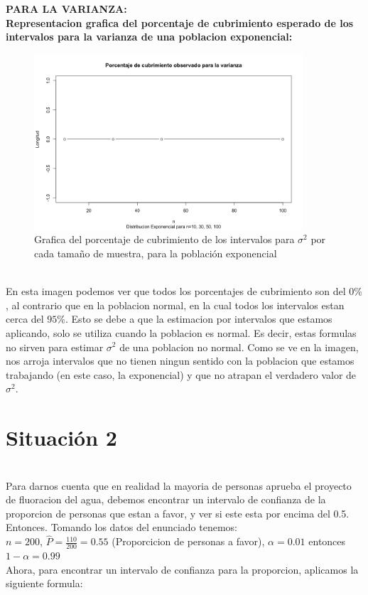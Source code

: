 \documentclass[letterpaper,12pt,onecolumn,titlepage]{article}
\begin{document}
\pagebreak\textbf{PARA LA VARIANZA:}
~\\\textbf{Representacion grafica del porcentaje de cubrimiento esperado de los intervalos para la varianza de una poblacion exponencial:}
~\\ \begin{figure}[!h]
    \begin{center}
        \includegraphics[width=10cm]{Figuras/Pc2.png}
        \caption{Grafica del porcentaje de cubrimiento de los intervalos para $\sigma^2$ por cada tama\~{n}o de muestra, para la poblaci\'{o}n exponencial}
        \label{fig:Densidad}
    \end{center}
\end{figure}
~\\ En esta imagen podemos ver que todos los porcentajes de cubrimiento son del $0\%$, al contrario que en la poblacion normal, en la cual todos los intervalos estan cerca del $95\%$. Esto se debe a que la estimacion por intervalos que estamos aplicando, solo se utiliza cuando la poblacion es normal. Es decir, estas formulas no sirven para estimar $\sigma^2$ de una poblacion no normal. Como se ve en la imagen, nos arroja intervalos que no tienen ningun sentido con la poblacion que estamos trabajando (en este caso, la exponencial) y que no atrapan el verdadero valor de $\sigma^2$.

\pagebreak\section{Situaci\'{o}n 2}
~\\ Para darnos cuenta que en realidad la mayoria de personas aprueba el proyecto de fluoracion del agua, debemos encontrar un intervalo de confianza de la proporcion de personas que estan a favor, y ver si este esta por encima del 0.5.
~\\ Entonces. Tomando los datos del enunciado tenemos:
~\\ $n=200$, $\hat{P}=\frac{110}{200}=0.55$ (Proporcicion de personas a favor), $\alpha=0.01$ entonces $1-\alpha=0.99$
~\\ Ahora, para encontrar un intervalo de confianza para la proporcion, aplicamos la siguiente formula:
\end{document}

